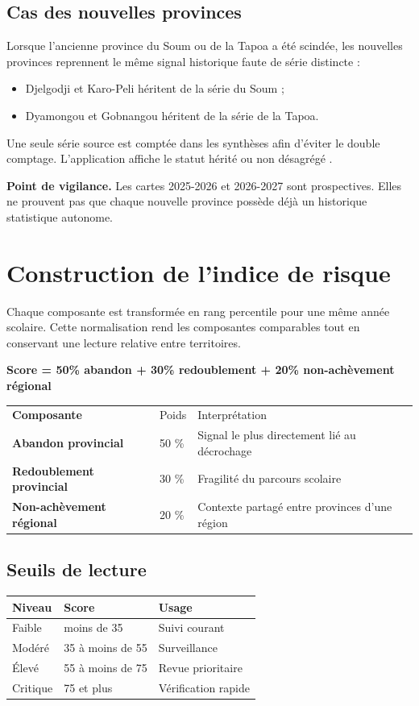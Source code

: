 \documentclass[12pt,a4paper]{article}
\newcommand{\note}[1]{\colorbox{SoftOrange}{\parbox{0.96\linewidth}{\textbf{\color{Orange}Point de vigilance.} #1}}}
\begin{document}
\subsection{Cas des nouvelles provinces}
Lorsque l'ancienne province du Soum ou de la Tapoa a été scindée, les nouvelles provinces reprennent le même signal historique faute de série distincte :
\begin{itemize}
  \item Djelgodji et Karo-Peli héritent de la série du Soum ;
  \item Dyamongou et Gobnangou héritent de la série de la Tapoa.
\end{itemize}

Une seule série source est comptée dans les synthèses afin d'éviter le double comptage. L'application affiche le statut \og hérité \fg{} ou \og non désagrégé \fg{}.

\note{Les cartes 2025-2026 et 2026-2027 sont prospectives. Elles ne prouvent pas que chaque nouvelle province possède déjà un historique statistique autonome.}
\clearpage
\thispagestyle{fancy}

\section{Construction de l'indice de risque}
Chaque composante est transformée en rang percentile pour une même année scolaire. Cette normalisation rend les composantes comparables tout en conservant une lecture relative entre territoires.

\begin{center}
{\Large\bfseries\color{Blue}Score = 50\% abandon + 30\% redoublement + 20\% non-achèvement régional}
\end{center}

\begin{tabularx}{\textwidth}{>{\bfseries}p{4cm} p{2cm} X}
\rowcolor{Navy}\color{white}Composante & \color{white}Poids & \color{white}Interprétation\\
Abandon provincial & 50 \% & Signal le plus directement lié au décrochage\\
Redoublement provincial & 30 \% & Fragilité du parcours scolaire\\
Non-achèvement régional & 20 \% & Contexte partagé entre provinces d'une région\\
\end{tabularx}

\subsection{Seuils de lecture}
\begin{tabularx}{\textwidth}{p{3cm} p{3.5cm} X}
\toprule
Niveau & Score & Usage\\
\midrule
Faible & moins de 35 & Suivi courant\\
Modéré & 35 à moins de 55 & Surveillance\\
Élevé & 55 à moins de 75 & Revue prioritaire\\
Critique & 75 et plus & Vérification rapide\\
\bottomrule
\end{tabularx}
\end{document}
